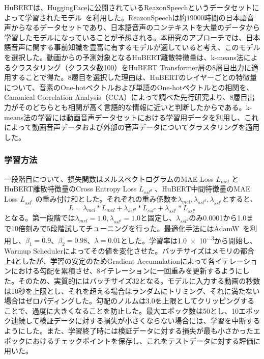 \documentclass[12pt]{jarticle}
\numberwithin{equation}{section}    %
\numberwithin{figure}{section}      %
\numberwithin{table}{section}      %
\begin{document}
HuBERTは、HuggingFaceに公開されているReazonSpeechというデータセットによって学習されたモデル~\cite{rinna-japanese-hubert-base,sawada2024release}を利用した。ReazonSpeechは約19000時間の日本語音声からなるデータセットであり、日本語音声のコンテキストを大量のデータから学習したモデルになっていることが予想される。本研究のアプローチでは、日本語音声に関する事前知識を豊富に有するモデルが適していると考え、このモデルを選択した。動画からの予測対象となるHuBERT離散特徴量は、k-means法によるクラスタリング（クラスタ数100）をHuBERT Transformer層の8層目出力に適用することで得た。8層目を選択した理由は、HuBERTのレイヤーごとの特徴量について、音素のOne-hotベクトルおよび単語のOne-hotベクトルとの相関を、Canonical Correlation Analysis（CCA）によって調べた先行研究\cite{pasad2023comparative}より、8層目出力がそのどちらとも相関が高く言語的な情報に近いと判断したからである。k-means法の学習には動画音声データセットにおける学習用データを利用し、これによって動画音声データおよび外部の音声データについてクラスタリングを適用した。

\subsubsection{学習方法}
一段階目について、損失関数はメルスペクトログラムのMAE Loss $L_{mel}$ とHuBERT離散特徴量のCross Entropy Loss $L_{ssl^{d}}$ 、HuBERT中間特徴量のMAE Loss $L_{ssl^{i}}$ の重み付け和とした。それぞれの重み係数を$\lambda_{mel}, \lambda_{ssl^{d}}, \lambda_{ssl^{i}}$とすると、
\begin{equation}
    \label{sec4:eq:loss}
    L = \lambda_{mel} * L_{mel} + \lambda_{ssl^{d}} * L_{ssl^{d}} + \lambda_{ssl^{i}} * L_{ssl^{i}}
\end{equation}
となる。第一段階では$\lambda_{mel} = 1.0, \lambda_{ssl^{i}} = 1.0$と固定し、$\lambda_{ssl^{d}}$のみ0.0001から1.0まで10倍刻みで5段階試してチューニングを行った。最適化手法にはAdamW~\cite{loshchilov2017decoupled}を利用し、$\beta_{1} = 0.9$、$\beta_{2} = 0.98$、$\lambda = 0.01$とした。学習率は\num{1.0e-3}から開始し、Warmup Schedulerによってその値を変化させた。バッチサイズはメモリの都合上4としたが、学習の安定のためGradient Accumulationによって各イテレーションにおける勾配を累積させ、8イテレーションに一回重みを更新するようにした。そのため、実質的にはバッチサイズ32となる。モデルに入力する動画の秒数は10秒を上限とし、それを超える場合はランダムにトリミング、それに満たない場合はゼロパディングした。勾配のノルムは3.0を上限としてクリッピングすることで、過度に大きくなることを防止した。最大エポック数は50とし、10エポック連続して検証データに対する損失が小さくならない場合には、学習を中断するようにした。また、学習終了時には検証データに対する損失が最も小さかったエポックにおけるチェックポイントを保存し、これをテストデータに対する評価に用いた。
\end{document}
